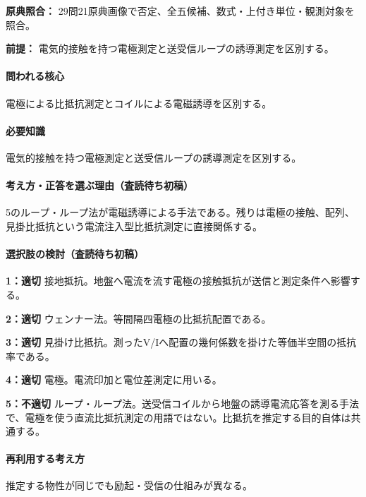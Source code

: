 \noindent\textbf{原典照合：} 29問21原典画像で否定、全五候補、数式・上付き単位・観測対象を照合。\par

\noindent\textbf{前提：} 電気的接触を持つ電極測定と送受信ループの誘導測定を区別する。\par

\paragraph{問われる核心} 電極による比抵抗測定とコイルによる電磁誘導を区別する。

\paragraph{必要知識} 電気的接触を持つ電極測定と送受信ループの誘導測定を区別する。

\paragraph{考え方・正答を選ぶ理由（査読待ち初稿）} 5のループ・ループ法が電磁誘導による手法である。残りは電極の接触、配列、見掛比抵抗という電流注入型比抵抗測定に直接関係する。

\paragraph{選択肢の検討（査読待ち初稿）}\mbox{}\par

\noindent\textbf{1：適切} 接地抵抗。地盤へ電流を流す電極の接触抵抗が送信と測定条件へ影響する。\par

\noindent\textbf{2：適切} ウェンナー法。等間隔四電極の比抵抗配置である。\par

\noindent\textbf{3：適切} 見掛け比抵抗。測ったV/Iへ配置の幾何係数を掛けた等価半空間の抵抗率である。\par

\noindent\textbf{4：適切} 電極。電流印加と電位差測定に用いる。\par

\noindent\textbf{5：不適切} ループ・ループ法。送受信コイルから地盤の誘導電流応答を測る手法で、電極を使う直流比抵抗測定の用語ではない。比抵抗を推定する目的自体は共通する。\par

\paragraph{再利用する考え方} 推定する物性が同じでも励起・受信の仕組みが異なる。

